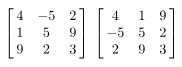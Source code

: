 {$\left[\hskip -3pt \begin{array}{ccc} 4&-5&2\\  1&5&9
\\  9&2&3\end{array}\hskip -3pt \right] $}
{$\left[\hskip -3pt \begin{array}{ccc} 4&1&9\\  -5&5&2
\\  2&9&3\end{array}\hskip -3pt \right] $}

